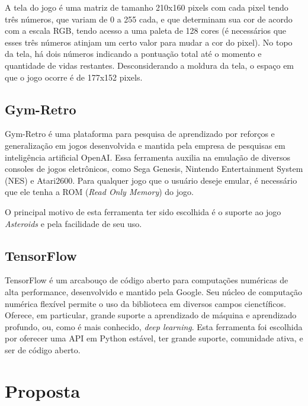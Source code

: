 A tela do jogo é uma matriz de tamanho 210x160 pixels com cada pixel tendo três números, que variam de 0 a 255 cada, e que determinam sua cor de acordo com a escala RGB, tendo acesso a uma paleta de 128 cores (é necessários que esses três números atinjam um certo valor para mudar a cor do pixel).
No topo da tela, há dois números indicando a pontuação total até o momento e quantidade de vidas restantes.
Desconsiderando a moldura da tela, o espaço em que o jogo ocorre é de 177x152 pixels.



\subsection{Gym-Retro}
\label{sec:gymretro}

Gym-Retro é uma plataforma para pesquisa de aprendizado por reforços e generalização em jogos desenvolvida e mantida pela empresa de pesquisas em inteligência artificial OpenAI. Essa ferramenta auxilia na emulação de diversos consoles de jogos eletrônicos, como Sega Genesis, Nintendo Entertainment System (NES) e Atari2600. Para qualquer jogo que o usuário deseje emular, é necessário que ele tenha a ROM (\textit{Read Only Memory}) do jogo.

O principal motivo de esta ferramenta ter sido escolhida é o suporte ao jogo \textit{Asteroids} e pela facilidade de seu uso.
\subsection{TensorFlow}
\label{sec:tensorflow}

TensorFlow é um arcabouço de código aberto para computações numéricas de alta performance, desenvolvido e mantido pela Google.
Seu núcleo de computação numérica flexível permite o uso da biblioteca em diversos campos cienctíficos.
Oferece, em particular, grande suporte a aprendizado de máquina e aprendizado profundo, ou, como é mais conhecido, \textit{deep learning}.
Esta ferramenta foi escolhida por oferecer uma API em Python estável, ter grande suporte, comunidade ativa, e ser de código aberto.


\section{Proposta}
\label{sec:proposta}

